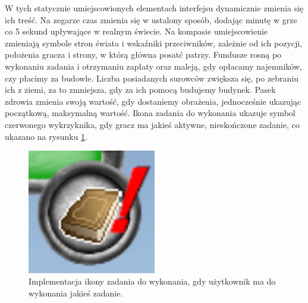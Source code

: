 W tych statycznie umiejscowionych elementach interfejsu dynamicznie zmienia się ich treść. Na zegarze czas zmienia się w ustalony sposób,
dodając minutę w grze co 5 sekund upływające w realnym świecie. Na kompasie umiejscowienie zmieniają symbole stron świata i wskaźniki przeciwników,
zależnie od ich pozycji, położenia gracza i strony, w którą główna posatć patrzy. Fundusze rosną po wykonaniu zadania i otrzymaniu zapłaty oraz maleją, gdy opłacamy
najemników, czy płacimy za budowle. Liczba posiadanych surowców zwiększa się, po zebraniu ich z ziemi, za to zmniejsza, gdy za ich pomocą budujemy budynek.  
Pasek zdrowia zmienia swoją wartość, gdy dostaniemy obrażenia, jednocześnie ukazując początkową, maksymalną wartość. Ikona zadania do wykonania ukazuje symbol 
czerwonego wykrzyknika, gdy gracz ma jakieś aktywne, nieskończone zadanie, co ukazano na rysunku \ref{fig:wyq}.
\begin{figure}[htbp]
    \centering
    \includegraphics[width=0.5\textwidth]{images/ui/wykrzyknik_quest.png}
    \caption{Implementacja ikony zadania do wykonania, gdy użytkownik ma do wykonania jakieś zadanie.
    }\label{fig:wyq}
\end{figure}

